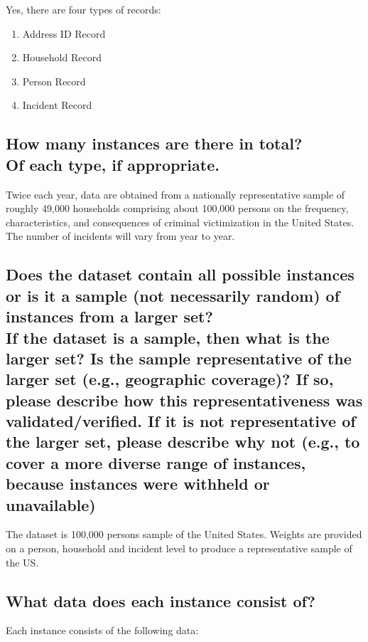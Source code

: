 \documentclass[letterpaper, 10 pt, conference]{ieeeconf}  %
\newcommand{\subtitle}[1]{{\\ \small \normalfont \color{purple} #1}}
\begin{document}
Yes, there are four types of records:

\begin{enumerate}
    \item Address ID Record
    \item Household Record
    \item Person Record
    \item Incident Record
\end{enumerate}

\subsection{How many instances are there in total? \subtitle{Of each type, if appropriate.}}

Twice each year, data are obtained from a nationally representative sample of roughly 49,000 households comprising about 100,000 persons on the frequency, characteristics, and consequences of criminal victimization in the United States. The number of incidents will vary from year to year.

\subsection{Does the dataset contain all possible instances or is it a sample (not necessarily random) of instances from a larger set? \subtitle{If the dataset is a sample, then what is the larger set? Is the sample representative of the larger set (e.g., geographic coverage)? If so, please describe how this representativeness was validated/verified. If it is not representative of the larger set, please describe why not (e.g., to cover a more diverse range of instances, because instances were withheld or unavailable)}}

The dataset is 100,000 persons sample of the United States. Weights are provided on a person, household and incident level to produce a representative sample of the US.

\subsection{What data does each instance consist of?}

Each instance consists of the following data:
\end{document}
